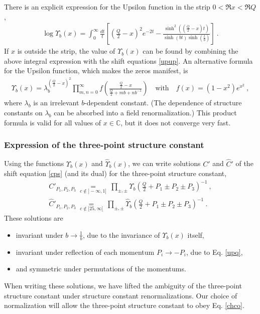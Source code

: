 \documentclass[12pt, a4paper, notitlepage, twoside]{report}
\numberwithin{equation}{section}
\theoremstyle{break}
\begin{document}
There is an explicit expression for the Upsilon function in the strip $0<\Re x<\Re Q$, 
\begin{align}
 \log\Upsilon_b(x) = \int_0^\infty \frac{dt}{t} \left[\left(\tfrac{Q}{2}-x\right)^2 e^{-2t} -\frac{\sinh^2\left(\left(\frac{Q}{2}-x\right)\!t\right)}{\sinh (bt)\sinh\left(\frac{t}{b}\right)}\right]\ .
\label{lup}
\end{align}
If $x$ is outside the strip, the value of $\Upsilon_b(x)$ can be found by combining the above integral expression with the shift equations \eqref{upup}.
An alternative formula for the Upsilon function, which makes the zeros manifest, is 
\begin{align}
 \Upsilon_b(x) = \lambda_b^{(\frac{Q}{2}-x)^2}\prod_{m,n=0}^\infty f\left(\frac{\frac{Q}{2}-x}{\frac{Q}{2}+mb+nb^{-1}}\right) \quad \text{with} \quad f(x)=(1-x^2)e^{x^2}\ ,
\end{align}
where $\lambda_b$ is an irrelevant $b$-dependent constant. (The dependence of structure constants on $\lambda_b$ can be absorbed into a field renormalization.)
This product formula is valid for all values of $x\in\mathbb{C}$, but it does not converge very fast.

\subsubsection{Expression of the three-point structure constant}

Using the functions $\Upsilon_b(x)$ and $\hat\Upsilon_b(x)$, we can write solutions $C'$ and $\hat C'$ of the shift equation \eqref{cps} (and its dual) for the three-point structure constant, 
\begin{align}
 \boxed{C'_{P_1,P_2,P_3} \ \underset{c\notin ]-\infty, 1]}{=}\ \prod_{\pm,\pm} \Upsilon_b\left(\tfrac{Q}{2}+P_1\pm P_2 \pm P_3\right)^{-1} }\ ,
 \label{cp}
 \\
 \boxed{\hat C'_{P_1,P_2,P_3} \ \underset{c\notin [25,\infty[}{=}\ \prod_{\pm,\pm} \hat\Upsilon_b\left(\tfrac{Q}{2}+P_1\pm P_2 \pm P_3\right)^{-1}}\ .
 \label{hcp}
\end{align}
These solutions are 
\begin{itemize}
 \item invariant under $b\to \frac{1}{b}$, due to the invariance of $\Upsilon_b(x)$ itself,
 \item invariant under reflection of each momentum $P_i\to -P_i$, due to Eq. \eqref{upq},
 \item and symmetric under permutations of the momentums.
\end{itemize}
When writing these solutions, we have lifted the ambiguity of the three-point structure constant under structure constant renormalizations. Our choice of normalization will allow the three-point structure constant to obey Eq. \eqref{chco}.
\end{document}
